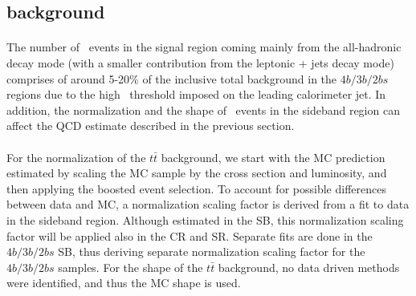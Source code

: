 




\pagebreak{}
\subsection{\ttbar background}
\label{sec:boosted-ttbar}

\paragraph{}
The number of \ttbar\ events in the signal region coming mainly from the all-hadronic decay mode (with a smaller contribution from the leptonic + jets decay mode) comprises of  around 5-20\%  of the inclusive total background in the $4b/3b/2bs$ regions due to the high \pt\ threshold imposed on the leading \largeR calorimeter jet. In addition, the normalization and the shape of \ttbar\ events in the sideband region can affect the QCD estimate described in the previous section.

\paragraph{}
For the normalization of the $t\bar{t}$ background, we start with the MC prediction estimated by scaling the MC sample by the cross section and luminosity, and then applying the boosted event selection.  To account for possible differences between data and MC, a normalization scaling factor  is derived from a fit to data in the sideband region.  Although estimated in the SB, this normalization scaling factor will be applied also in the CR and SR.  Separate fits are done in the $4b/3b/2bs$  SB, thus deriving separate normalization scaling factor for the $4b/3b/2bs$ samples. For the shape of the $t\bar{t}$ background, no data driven methods were identified, and thus the MC shape is used.  

